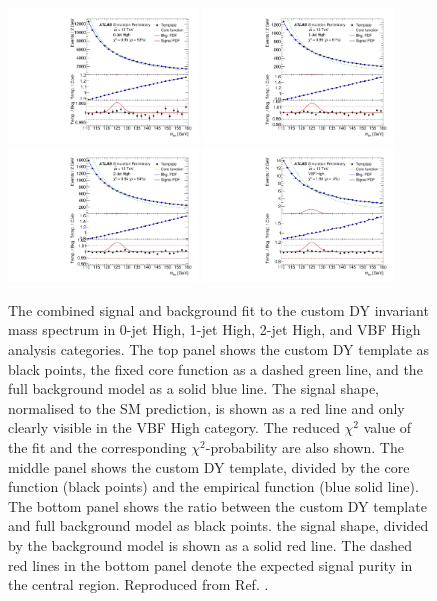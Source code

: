 \begin{figure}[h!]
  \centering
  \includegraphics[width=0.45\textwidth]{figures/hmumu/SS/BDT10}
  \includegraphics[width=0.45\textwidth]{figures/hmumu/SS/BDT7}
  \includegraphics[width=0.45\textwidth]{figures/hmumu/SS/BDT4}
  \includegraphics[width=0.45\textwidth]{figures/hmumu/SS/BDT1}
  \caption[Spurious signal fit to custom DY mass spectrum]{
  The combined signal and background fit to the custom DY invariant
  mass spectrum in 0-jet High, 1-jet High, 2-jet High, and VBF High
  analysis categories. The top panel shows the custom DY template
  as black points, the fixed core function as a dashed green line,
  and the full background model as a solid blue line. The signal shape,
  normalised to the SM prediction, is shown as a red line and only clearly visible in the VBF High category.
  The reduced $\chi^2$ value of the fit and the corresponding
  $\chi^2$-probability are also shown. The middle panel shows
  the custom DY template, divided by the core function (black
  points) and the empirical function (blue solid line). The bottom
  panel shows the ratio between the custom DY template and
  full background model as black points. the signal shape, divided
  by the background model is shown as a solid red line. The dashed
  red lines in the bottom panel denote the expected signal purity
  in the central region. Reproduced from Ref. \cite{ATLAS-CONF-2019-028}.
  }
  \label{fig:hmumu:ss}
\end{figure}

